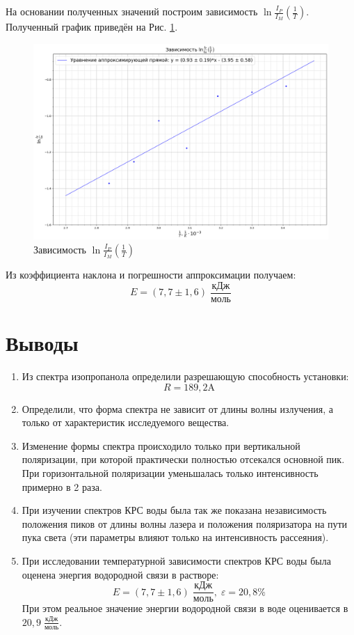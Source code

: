 \documentclass{article}
\begin{document}
На основании полученных значений построим зависимость $\ln{\frac{I_P}{I_M}}\left(\frac{1}{T}\right)$. Полученный график приведён на Рис. \ref{Водородная связь}.

\begin{figure}[h!]
\centering
    \includegraphics[width=0.7\linewidth]{Images/Нафиг график.png}
    \caption{Зависимость $\ln{\frac{I_P}{I_M}}\left(\frac{1}{T}\right)$}
    \label{Водородная связь}
\end{figure}


Из коэффициента наклона и погрешности аппроксимации получаем:
$$E = (7,7 \pm 1,6) \; \frac{\text{кДж}}{\text{моль}}$$
\section{Выводы}
\begin{enumerate}
    \item Из спектра изопропанола определили разрешающую способность установки:
    $$R = 189,2 \text{A}$$
    \item Определили, что форма спектра не зависит от длины волны излучения, а только от характеристик исследуемого вещества.
    \item Изменение формы спектра происходило только при вертикальной поляризации, при которой практически полностью отсекался основной пик. При горизонтальной поляризации уменьшалась только интенсивность примерно в 2 раза.
    \item При изучении спектров КРС воды была так же показана независимость положения пиков от длины волны лазера и положения поляризатора на пути пука света (эти параметры влияют только на интенсивность рассеяния).
    \item При исследовании температурной зависимости спектров КРС воды была оценена энергия водородной связи в растворе:
    $$E = (7,7 \pm 1,6) \; \frac{\text{кДж}}{\text{моль}}, \; \varepsilon = 20,8 \%$$
    При этом реальное значение энергии водородной связи в воде оценивается в $20,9 \; \frac{\text{кДж}}{\text{моль}}$.
\end{enumerate}
\end{document}
